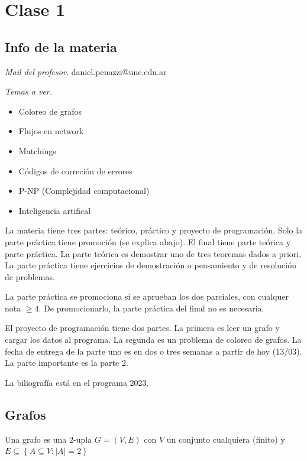 \documentclass[a4paper]{article}
\begin{document}
    

\pagebreak

\section{Clase 1}

\subsection{Info de la materia}

\textit{Mail del profesor.} daniel.penazzi@unc.edu.ar

\textit{Temas a ver.}

\begin{itemize}
    \item Coloreo de grafos 
    \item Flujos en network 
    \item Matchings 
    \item Códigos de correción de errores
    \item P-NP (Complejidad computacional)
    \item Inteligencia artifical
\end{itemize}

La materia tiene tres partes: teórico, práctico y proyecto de programación. Solo
la parte práctica tiene promoción (se explica abajo). El final tiene parte
teórica y parte práctica. La parte teórica es demostrar uno de tres teoremas
dados a priori. La parte práctica tiene ejercicios de demostración o pensamiento
y de resolución de problemas.

La parte práctica se promociona si se aprueban los dos parciales, con cualquer
nota $\geq 4$. De promocionarlo, la parte práctica del final no es necesaria.

El proyecto de programación tiene dos partes. La primera es leer un grafo y
cargar los datos al programa. La segunda es un problema de coloreo de grafos. La
fecha de entrega de la parte uno es en dos o tres semanas a partir de hoy
(13/03). La parte importante es la parte 2.

La biliografía está en el programa 2023.

\subsection{Grafos}

\begin{definition}
    Una grafo es una $2$-upla $G = (V, E)$ con $V$ un conjunto cualquiera (finito) y $E
    \subseteq \left\{ A \subseteq V : |A| = 2 \right\} $
\end{definition}
\end{document}
